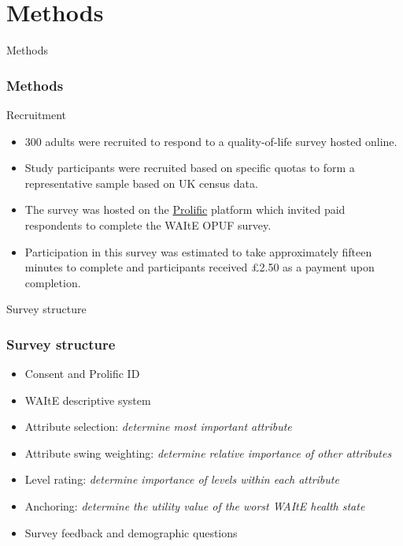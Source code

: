 \documentclass[t,compress,9pt,aspectratio=169]{beamer}
\begin{document}
\section{Methods}
\begin{frame}{Methods}
    \frametitle{Methods}
    \begin{block}{Recruitment}
        \begin{itemize}
        \item 300 adults were recruited to respond to a quality-of-life survey hosted online.
        \item Study participants were recruited based on specific quotas to form a representative sample based on UK census data.
        \item The survey was hosted on the \hyperlink{https://www.prolific.com}{Prolific} platform which invited paid respondents to complete the WAItE OPUF survey.
        \item Participation in this survey was estimated to take approximately fifteen minutes to complete and participants received £2.50 as a payment upon completion.
        \end{itemize}
    \end{block}
\end{frame}




\begin{frame}{Survey structure}
    \frametitle{Survey structure}
\begin{itemize}
    \item Consent and Prolific ID
    \item WAItE descriptive system
    \item Attribute selection: \textit{determine most important attribute}   
    \item Attribute swing weighting: \textit{determine relative importance of other attributes} 
    \item Level rating: \textit{determine importance of levels within each attribute}
    \item Anchoring: \textit{determine the utility value of the worst WAItE health state}
    \item Survey feedback and demographic questions
\end{itemize} 
\end{frame}
\end{document}
